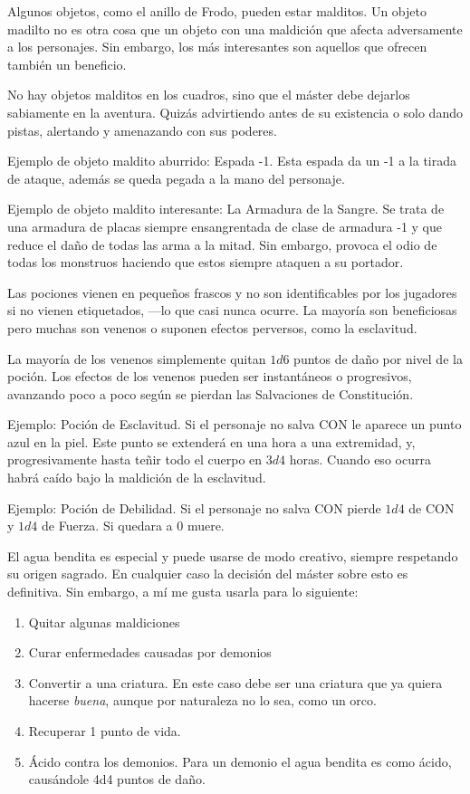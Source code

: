 \begin{multicols}{2}

Algunos objetos, como el anillo de Frodo, pueden estar malditos. Un objeto madilto
no es otra cosa que un objeto con una maldición que afecta adversamente a los
personajes. Sin embargo, los más interesantes son aquellos que ofrecen también un
beneficio.

No hay objetos malditos en los cuadros, sino que el máster debe dejarlos sabiamente
en la aventura. Quizás advirtiendo antes de su existencia o solo dando pistas, alertando
y amenazando con sus poderes.

Ejemplo de objeto maldito aburrido: Espada -1. Esta espada da un -1 a la tirada de
ataque, además se queda pegada a la mano del personaje.

Ejemplo de objeto maldito interesante: La Armadura de la Sangre. Se trata de una
armadura de placas siempre ensangrentada de clase de armadura -1 y que reduce el
daño de todas las arma a la mitad. Sin embargo, provoca el odio de todas los monstruos
haciendo que estos siempre ataquen a su portador.


Las pociones vienen en pequeños frascos y no son identificables por los jugadores
si no vienen etiquetados, ---lo que casi nunca ocurre. La mayoría son beneficiosas
pero muchas son venenos o suponen efectos perversos, como la esclavitud.

La mayoría de los venenos simplemente quitan $ 1d6$ puntos de daño por nivel de la
poción. Los efectos de los venenos pueden ser instantáneos o progresivos, avanzando
poco a poco según se pierdan las Salvaciones de Constitución.

Ejemplo: Poción de Esclavitud. Si el personaje no salva CON le aparece un punto azul
en la piel. Este punto se extenderá en una hora a una extremidad, y, progresivamente
hasta teñir todo el cuerpo en $ 3d4$ horas. Cuando eso ocurra habrá caído bajo la maldición
de la esclavitud.

Ejemplo: Poción de Debilidad. Si el personaje no salva CON pierde $ 1d4$ de CON y $ 1d4$ de Fuerza.
Si quedara a 0 muere.


El agua bendita es especial y puede usarse de modo creativo, siempre respetando
su origen sagrado. En cualquier caso la decisión del máster sobre esto es definitiva.
Sin embargo, a mí me gusta usarla para lo siguiente:

\begin{enumerate}[label={\alph*)}]
\item Quitar algunas maldiciones
\item Curar enfermedades causadas por demonios
\item Convertir a una criatura. En este caso debe ser una criatura que ya quiera hacerse \emph{buena}, aunque por naturaleza no lo sea, como un orco.
\item Recuperar 1 punto de vida.
\item Ácido contra los demonios. Para un demonio el agua bendita es como ácido, causándole 4d4 puntos de daño.
\end{enumerate}


\end{multicols}
